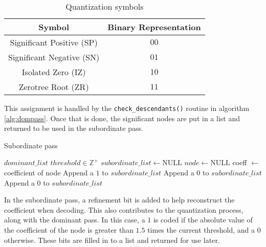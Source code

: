 \documentclass[./A14_Report.tex]{subfiles}
\begin{document}
\begin{table}[H]
    \centering
    \begin{tabular}{|c|c|}
        \hline
        \textbf{Symbol} & \textbf{Binary Representation}\\
        \hline
        Significant Positive (SP) & $00$\\
        Significant Negative (SN) & $01$\\
        Isolated Zero (IZ) & $10$\\
        Zerotree Root (ZR) & $11$\\
        \hline
    \end{tabular}
    \caption{Quantization symbols}
    \label{tab:qsymbs}
\end{table}

This assignment is handled by the \texttt{check_descendants()} routine in
algorithm \ref{alg:dompass}. Once that is done, the significant nodes are put
in a list and returned to be used in the subordinate pass.

\begin{algorithm}[H]
    \caption{Subordinate pass}
    \label{alg:subpass}
    \begin{algorithmic}
        \Require $dominant\_list$
        \Require $threshold \in \mathbb{Z}^+$
        \State $subordinate\_list \gets \text{NULL}$
        \State $node \gets \text{NULL}$
            \State coeff $\gets$ coefficient of node
                    \State Append a $1$ to $subordinate\_list$
                \Else
                    \State Append a $0$ to $subordinate\_list$
                \EndIf
            \Else
                \State Append a $0$ to $subordinate\_list$
            \EndIf
        \EndFor
    \end{algorithmic}
\end{algorithm}

In the subordinate pass, a refinement bit is added to help reconstruct the
coefficient when decoding. This also contributes to the quantization process,
along with the dominant pass. In this case, a $1$ is coded if the absolute
value of the coefficient of the node is greater than $1.5$ times the current
threshold, and a $0$ otherwise. These bits are filled in to a list and returned
for use later.
\end{document}
